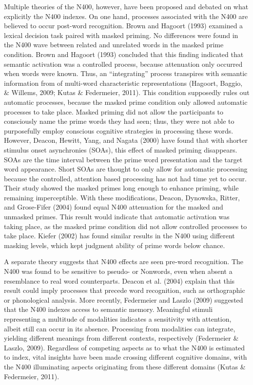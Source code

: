 \documentclass[english,man]{apa6}
\theoremstyle{definition}
\theoremstyle{definition}
\theoremstyle{definition}
\theoremstyle{remark}
\begin{document}
Multiple theories of the N400, however, have been proposed and debated
on what explicitly the N400 indexes. On one hand, processes associated
with the N400 are believed to occur post-word recognition. Brown and
Hagoort (1993) examined a lexical decision task paired with masked
priming. No differences were found in the N400 wave between related and
unrelated words in the masked prime condition. Brown and Hagoort (1993)
concluded that this finding indicated that semantic activation was a
controlled process, because attenuation only occurred when words were
known. Thus, an \enquote{integrating} process transpires with semantic
information from of multi-word characteristic representations (Hagoort,
Baggio, \& Willems, 2009; Kutas \& Federmeier, 2011). This condition
supposedly rules out automatic processes, because the masked prime
condition only allowed automatic processes to take place. Masked priming
did not allow the participants to consciously name the prime words they
had seen; thus, they were not able to purposefully employ conscious
cognitive strategies in processing these words. However, Deacon, Hewitt,
Yang, and Nagata (2000) have found that with shorter stimulus onset
asynchronies (SOAs), this effect of masked priming disappears. SOAs are
the time interval between the prime word presentation and the target
word appearance. Short SOAs are thought to only allow for automatic
processing because the controlled, attention based processing has not
had time yet to occur. Their study showed the masked primes long enough
to enhance priming, while remaining imperceptible. With these
modifications, Deacon, Dynowska, Ritter, and Grose-Fifer (2004) found
equal N400 attenuation for the masked and unmasked primes. This result
would indicate that automatic activation was taking place, as the masked
prime condition did not allow controlled processes to take place. Kiefer
(2002) has found similar results in the N400 using different masking
levels, which kept judgment ability of prime words below chance.

A separate theory suggests that N400 effects are seen pre-word
recognition. The N400 was found to be sensitive to pseudo- or Nonwords,
even when absent a resemblance to real word counterparts. Deacon et al.
(2004) explain that this result could imply processes that precede word
recognition, such as orthographic or phonological analysis. More
recently, Federmeier and Laszlo (2009) suggested that the N400 indexes
access to semantic memory. Meaningful stimuli representing a multitude
of modalities indicates a sensitivity with attention, albeit still can
occur in its absence. Processing from modalities can integrate, yielding
different meanings from different contexts, respectively (Federmeier \&
Laszlo, 2009). Regardless of competing aspects as to what the N400 is
estimated to index, vital insights have been made crossing different
cognitive domains, with the N400 illuminating aspects originating from
these different domains (Kutas \& Federmeier, 2011).
\end{document}
